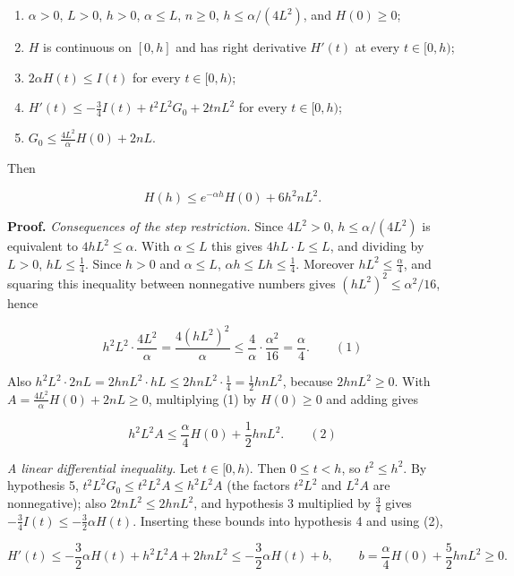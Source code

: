 \documentclass[11pt,a4paper]{article}
\begin{document}
\begin{enumerate}


\item \(\alpha>0\), \(L>0\), \(h>0\), \(\alpha\le L\), \(n\ge0\), \(h\le\alpha/(4L^2)\), and \(H(0)\ge0\);

\item \(H\) is continuous on \([0,h]\) and has right derivative \(H'(t)\) at every \(t\in[0,h)\);

\item \(2\alpha H(t)\le I(t)\) for every \(t\in[0,h)\);

\item \(H'(t)\le-\frac34I(t)+t^2L^2G_0+2tnL^2\) for every \(t\in[0,h)\);

\item \(G_0\le\frac{4L^2}{\alpha}H(0)+2nL\).

\end{enumerate}



Then


\[H(h)\le e^{-\alpha h}H(0)+6h^2nL^2.\]


\textbf{Proof.} \emph{Consequences of the step restriction.} Since \(4L^2>0\), \(h\le\alpha/(4L^2)\) is equivalent to \(4hL^2\le\alpha\). With \(\alpha\le L\) this gives \(4hL\cdot L\le L\), and dividing by \(L>0\), \(hL\le\frac14\). Since \(h>0\) and \(\alpha\le L\), \(\alpha h\le Lh\le\frac14\). Moreover \(hL^2\le\frac\alpha4\), and squaring this inequality between nonnegative numbers gives \((hL^2)^2\le\alpha^2/16\), hence


\[h^2L^2\cdot\frac{4L^2}{\alpha}=\frac{4(hL^2)^2}{\alpha}\le\frac{4}{\alpha}\cdot\frac{\alpha^2}{16}=\frac\alpha4.\qquad(1)\]


Also \(h^2L^2\cdot2nL=2hnL^2\cdot hL\le2hnL^2\cdot\frac14=\frac12hnL^2\), because \(2hnL^2\ge0\). With \(A=\frac{4L^2}{\alpha}H(0)+2nL\ge0\), multiplying (1) by \(H(0)\ge0\) and adding gives


\[h^2L^2A\le\frac\alpha4H(0)+\frac12hnL^2.\qquad(2)\]


\emph{A linear differential inequality.} Let \(t\in[0,h)\). Then \(0\le t<h\), so \(t^2\le h^2\). By hypothesis 5, \(t^2L^2G_0\le t^2L^2A\le h^2L^2A\) (the factors \(t^2L^2\) and \(L^2A\) are nonnegative); also \(2tnL^2\le2hnL^2\), and hypothesis 3 multiplied by \(\frac34\) gives \(-\frac34I(t)\le-\frac32\alpha H(t)\). Inserting these bounds into hypothesis 4 and using (2),


\[H'(t)\le-\frac32\alpha H(t)+h^2L^2A+2hnL^2\le-\frac32\alpha H(t)+b,\qquad b=\frac\alpha4H(0)+\frac52hnL^2\ge0.\]
\end{document}
